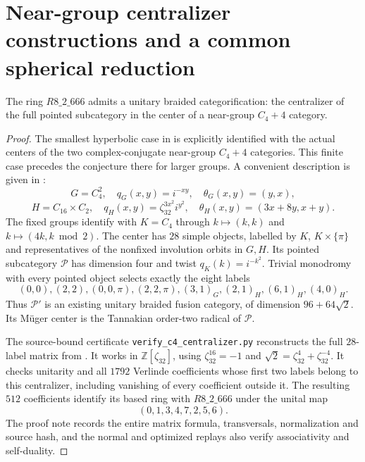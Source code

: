 \section{Near-group centralizer constructions and a common spherical reduction}
\label{sec:simple-galois-pu}

\begin{proposition}\label{prop:c4-centralizer}
The ring $R8\_2\_666$ admits a unitary braided categorification:
the centralizer of the full pointed subcategory in the center
of a near-group $C_4+4$ category.
\end{proposition}
\begin{proof}
The smallest hyperbolic case in
\cite[Section~3.2.3.1]{GIQuadraticData} is explicitly identified
with the actual centers of the two complex-conjugate near-group
$C_4+4$ categories. This finite case precedes the conjecture
there for larger groups. A convenient description is given in
\cite[Section~2.4]{BRWRealizing}:
\[
G=C_4^2,\quad q_G(x,y)=i^{-xy},\quad \theta_G(x,y)=(y,x),
\]
\[
H=C_{16}\times C_2,\quad
q_H(x,y)=\zeta_{32}^{3x^2}i^{y^2},\quad
\theta_H(x,y)=(3x+8y,x+y).
\]
The fixed groups identify with $K=C_4$ through
$k\mapsto(k,k)$ and $k\mapsto(4k,k\bmod2)$.
The center has $28$ simple objects, labelled by
$K$, $K\times\{\pi\}$ and representatives of the nonfixed
involution orbits in $G,H$.
Its pointed subcategory $\mathcal P$ has dimension four and
twist $q_K(k)=i^{-k^2}$. Trivial monodromy with every pointed
object selects exactly the eight labels
\[
(0,0),(2,2),(0,0,\pi),(2,2,\pi),
(3,1)_G,(2,1)_H,(6,1)_H,(4,0)_H.
\]
Thus $\mathcal P'$ is an existing unitary braided fusion
category, of dimension $96+64\sqrt2$. Its M\"uger center is
the Tannakian order-two radical of $\mathcal P$.

The source-bound certificate
\texttt{verify\_c4\_centralizer.py} reconstructs the full
$28$-label matrix from \cite[Equation~(1)]{BRWRealizing}.
It works in $\mathbb Z[\zeta_{32}]$, using
$\zeta_{32}^{16}=-1$ and
$\sqrt2=\zeta_{32}^4+\zeta_{32}^{-4}$.
It checks unitarity and all $1792$ Verlinde coefficients
whose first two labels belong to this centralizer, including
vanishing of every coefficient outside it.
The resulting $512$ coefficients identify its based ring
with $R8\_2\_666$ under the unital map
\[
(0,1,3,4,7,2,5,6).
\]
The proof note records the entire matrix formula, transversals,
normalization and source hash, and the normal and optimized
replays also verify associativity and self-duality.
\end{proof}

